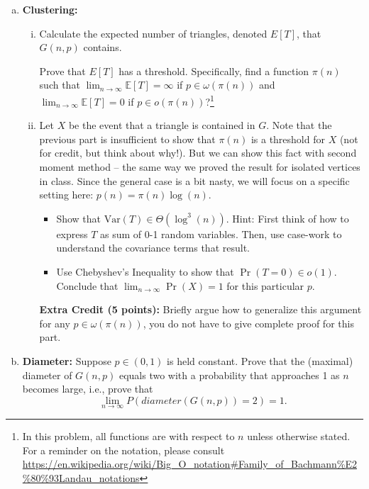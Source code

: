 \documentclass[11pt]{article}
\newcommand{\ra}{\rightarrow}
\newcommand{\prob}[1]{P\left(#1\right)}
\newcommand{\Exp}[1]{\mathbb{E}\left[#1\right]} %
\begin{document}
\begin{enumerate}[(a)]



\item {\bf Clustering:}
    \begin{enumerate}[(i)]
        \item Calculate the expected number of triangles, denoted $E[T]$, that $G(n,p)$ contains.

        Prove that $E[T]$ has a threshold.
        Specifically, find a function $\pi(n)$ such that $\lim_{n \ra \infty} \Exp{T} = \infty$ if $p \in \omega(\pi(n))$ and $\lim_{n \ra \infty} \Exp{T} = 0$ if $p \in o(\pi(n))$?\footnote{
            In this problem, all functions are with respect to $n$ unless otherwise stated.
            For a reminder on the notation, please consult \url{https://en.wikipedia.org/wiki/Big\_O\_notation\#Family\_of\_Bachmann\%E2\%80\%93Landau\_notations}
        }

        \item Let $X$ be the event that a triangle is contained in $G$.
            Note that the previous part is insufficient to show that $\pi(n)$ is a threshold for $X$ (not for credit, but think about why!).
            But we can show this fact with second moment method -- the same way we proved the result for isolated vertices in class. Since the general case is a bit nasty, we will focus on a specific setting here: $p(n) = \pi(n)\log(n)$.
            \begin{itemize}
                \item Show that $\text{Var}(T) \in \Theta(\log^3(n))$. Hint: First think of how to express $T$ as sum of 0-1 random variables.  Then, use case-work to understand the covariance terms that result.
                \item Use Chebyshev's Inequality to show that $\Pr(T = 0) \in o(1)$.
                    Conclude that $\lim_{n\to\infty} \Pr(X) = 1$ for this particular $p$.
            \end{itemize}
            \textbf{Extra Credit (5 points):} Briefly argue how to generalize this argument for any $p \in \omega(\pi(n))$, you do not have to give complete proof for this part.
    \end{enumerate}


\item {\bf Diameter:} Suppose $p \in (0,1)$ is held constant. Prove
  that the (maximal) diameter of $G(n,p)$ equals two with a probability that
  approaches 1 as $n$ becomes large, i.e., prove that
  $$\lim_{n \ra \infty} \prob{diameter(G(n,p)) = 2} = 1.$$

\end{enumerate}
\end{document}
